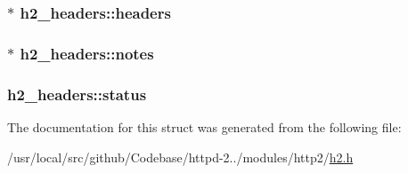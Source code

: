 \subsubsection[{\texorpdfstring{headers}{headers}}]{$\ast$ h2\+\_\+headers\+::headers}\hypertarget{structh2__headers_a6b07b460b8fb9e98c8cfdeff2f9b116c}{}\label{structh2__headers_a6b07b460b8fb9e98c8cfdeff2f9b116c}
\subsubsection[{\texorpdfstring{notes}{notes}}]{$\ast$ h2\+\_\+headers\+::notes}\hypertarget{structh2__headers_af0e025f1c1bd60c57424fa732cfe9359}{}\label{structh2__headers_af0e025f1c1bd60c57424fa732cfe9359}
\subsubsection[{\texorpdfstring{status}{status}}]{ h2\+\_\+headers\+::status}\hypertarget{structh2__headers_a70142770c78d4519277d43ba8902f03d}{}\label{structh2__headers_a70142770c78d4519277d43ba8902f03d}


The documentation for this struct was generated from the following file\+:\begin{DoxyCompactItemize}
\item 
/usr/local/src/github/\+Codebase/httpd-\/2../modules/http2/\hyperlink{h2_8h}{h2.\+h}\end{DoxyCompactItemize}
